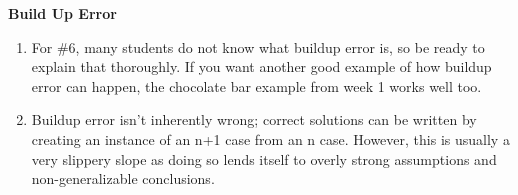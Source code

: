 \item \textbf{Build Up Error}
\begin{enumerate}[label=(*)]
\item For \#6, many students do not know what buildup error is, so be ready to explain that thoroughly. If you want another good example of how buildup error can happen, the chocolate bar example from week 1 works well too. 
\item Buildup error isn’t inherently wrong; correct solutions can be written by creating an instance of an n+1 case from an n case. However, this is usually a very slippery slope as doing so lends itself to overly strong assumptions and non-generalizable conclusions.
\end{enumerate}